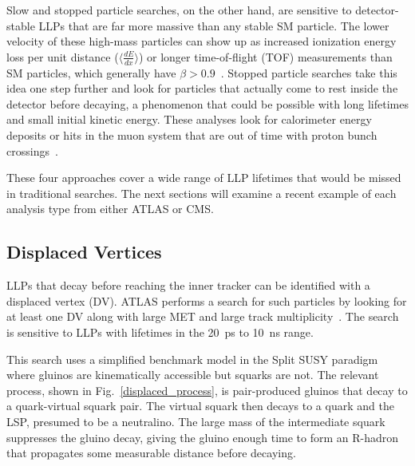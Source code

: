 \documentclass[12pt]{article}
\begin{document}
        Slow and stopped particle searches, on the other hand, are sensitive to detector-stable LLPs that are far more massive than any stable SM particle. The lower velocity of these high-mass particles can show up as increased ionization energy loss per unit distance ($\langle\frac{dE}{dx}\rangle$) or longer time-of-flight (TOF) measurements than SM particles, which generally have $\beta > \num{0.9}$~\cite{cms_hscp}. Stopped particle searches take this idea one step further and look for particles that actually come to rest inside the detector before decaying, a phenomenon that could be possible with long lifetimes and small initial kinetic energy. These analyses look for calorimeter energy deposits or hits in the muon system that are out of time with proton bunch crossings~\cite{cms_stopped}.

        These four approaches cover a wide range of LLP lifetimes that would be missed in traditional searches. The next sections will examine a recent example of each analysis type from either ATLAS or CMS.

    \subsection{Displaced Vertices}
        LLPs that decay before reaching the inner tracker can be identified with a displaced vertex (DV). ATLAS performs a search for such particles by looking for at least one DV along with large MET and large track multiplicity~\cite{atlas_displaced}. The search is sensitive to LLPs with lifetimes in the \SI{20}{\pico\s} to \SI{10}{\nano\s} range.

        This search uses a simplified benchmark model in the Split SUSY paradigm where gluinos are kinematically accessible but squarks are not. The relevant process, shown in Fig.~\ref{displaced_process}, is pair-produced gluinos that decay to a quark-virtual squark pair. The virtual squark then decays to a quark and the LSP, presumed to be a neutralino. The large mass of the intermediate squark suppresses the gluino decay, giving the gluino enough time to form an R-hadron that propagates some measurable distance before decaying. 
\end{document}
